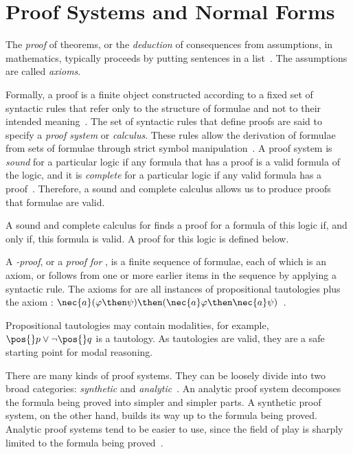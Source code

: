 \section{Proof Systems and Normal Forms}


The \emph{proof} of theorems, or the \emph{deduction} of consequences from
assumptions, in mathematics, typically proceeds by putting sentences in a
list~\cite{kleene2002mathematical}. The assumptions are called \emph{axioms}.

Formally, a proof is a finite object constructed according to a fixed set of syntactic
rules that refer only to the structure of formulae and not to their intended
meaning~\cite{fitting}. The set of syntactic rules that define proofs are said
to specify a \emph{proof system} or \emph{calculus}. These rules allow the
derivation of formulae from sets of formulae through strict symbol
manipulation~\cite{resolutionbased}. A proof system is \emph{sound} for a
particular logic if any formula that has a proof is a valid formula of the
logic, and it is \emph{complete} for a particular logic if any valid formula has
a proof~\cite{fitting}. Therefore, a sound and complete calculus allows us to
produce proofs that formulae are valid. 

A sound and complete calculus for  finds a proof for a formula of
this logic if, and only if, this formula is valid. A proof for this
logic is defined below.

\begin{definition}%
\label{def:kproof}
    A \emph{-proof}, or a \emph{proof for }, is a
    finite sequence of formulae, each of which is an axiom, or follows from one
    or more earlier items in the sequence by applying a syntactic rule. The
    axioms for  are all instances of propositional tautologies
    plus the axiom  : $\nec{a}(\varphi \then \psi) \then (\nec{a}
    \varphi \then \nec{a} \psi)$~\cite{blackburn2002modal}.
\end{definition}

Propositional tautologies may contain modalities, for example, $\pos{}p \lor
\neg \pos{} q$ is a tautology. As tautologies are valid, they are a safe
starting point for modal reasoning. 

There are many kinds of proof systems. They can be loosely divide into two broad
categories: \emph{synthetic} and \emph{analytic}~\cite{fitting}. An analytic
proof system decomposes the formula being proved into simpler and simpler parts.
A synthetic proof system, on the other hand, builds its way up to the formula being
proved. Analytic proof systems tend to be easier to use, since the field of
play is sharply limited to the formula being proved~\cite{fitting}. 

